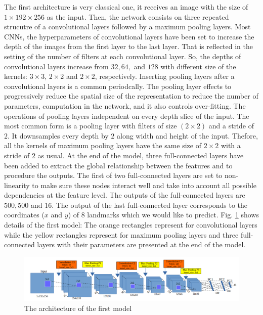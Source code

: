 The first architecture is very classical one, it receives an image with the size of $1 \times 192 \times 256$ as the input. Then, the network consists on three repeated strucutre of a convolutional layers followed by a maximum pooling layers. Most CNNs, the hyperparameters of convolutional layers have been set to increase the depth of the images from the first layer to the last layer. That is reflected in the setting of the number of filters at each convolutional layer. So, the depths of convolutional layers increase from $32, 64, $ and $128$ with different size of the kernels: $3 \times 3$, $2 \times 2$ and $2 \times 2$, respectively. Inserting pooling layers after a convolutional layers is a common periodcally. The pooling layer effects to progressively reduce the spatial size of the representation to reduce the number of parameters, computation in the network, and it also controls over-fitting. The operations of pooling layers independent on every depth slice of the input. The most common form is a pooling layer with filters of size $(2 \times 2)$ and a stride of $2$. It downsamples every depth by $2$ along width and height of the input. Thefore, all the kernels of maximum pooling layers have the same size of $2 \times 2$ with a stride of $2$ as usual. At the end of the model, three full-connected layers have been added to extract the global relationship between the features and to procedure the outputs. The first of two full-connected layers are set to non-linearity to make sure these nodes interact well and take into account all possible dependencies at the feature level. The outputs of the full-connected layers are $500, 500$ and $16$. The output of the last full-connected layer corresponds to the coordinates ($x$ and $y$) of $8$ landmarks which we would like to predict. Fig. \ref{fignet1} shows details of the first model: The orange rectangles represent for convolutional layers while the yellow rectangles represent for maximum pooling layers and three full-connected layers with their parameters are presented at the end of the model.

\begin{figure}[!h]
	\centering
	\includegraphics[scale=0.4]{images/net1}
	\caption{The architecture of the first model}
	\label{fignet1}
\end{figure}

